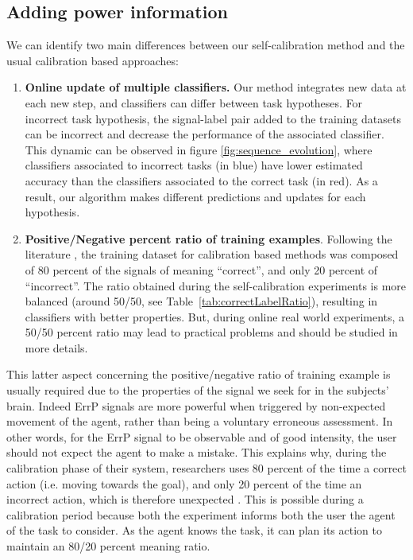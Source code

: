 \subsection{Adding power information}


We can identify two main differences between our self-calibration method and the usual calibration based approaches:
\begin{enumerate}
\item \textbf{Online update of multiple classifiers.} Our method integrates new data at each new step, and classifiers can differ between task hypotheses. For incorrect task hypothesis, the signal-label pair added to the training datasets can be incorrect and decrease the performance of the associated classifier. This dynamic can be observed in figure \ref{fig:sequence_evolution}, where classifiers associated to incorrect tasks (in blue) have lower estimated accuracy than the classifiers associated to the correct task (in red). As a result, our algorithm makes different predictions and updates for each hypothesis.
\item \textbf{Positive/Negative percent ratio of training examples}. Following the literature \cite{chavarriaga2010learning, Iturrate2013task}, the training dataset for calibration based methods was composed of 80 percent of the signals of meaning ``correct'', and only 20 percent of ``incorrect''. The ratio obtained during the self-calibration experiments is more balanced (around 50/50, see Table~\ref{tab:correctLabelRatio}), resulting in classifiers with better properties. But, during online real world experiments, a 50/50 percent ratio may lead to practical problems and should be studied in more details.
\end{enumerate}

This latter aspect concerning the positive/negative ratio of training example is usually required due to the properties of the signal we seek for in the subjects' brain. Indeed ErrP signals are more powerful when triggered by non-expected movement of the agent, rather than being a voluntary erroneous assessment. In other words, for the ErrP signal to be observable and of good intensity, the user should not expect the agent to make a mistake. This explains why, during the calibration phase of their system, researchers uses 80 percent of the time a correct action (i.e. moving towards the goal), and only 20 percent of the time an incorrect action, which is therefore unexpected \cite{chavarriaga2014errare}. This is possible during a calibration period because both the experiment informs both the user the agent of the task to consider. As the agent knows the task, it can plan its action to maintain an 80/20 percent meaning ratio.

